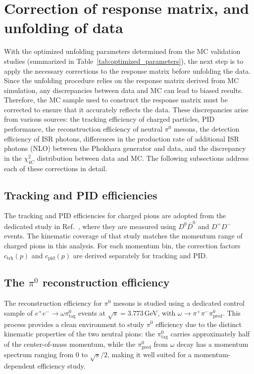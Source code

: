 \clearpage
\section{Correction of response matrix, and unfolding of data}
\label{sec:eff_corr}

With the optimized unfolding parameters determined from the MC validation studies (summarized in Table~\ref{tab:optimized_parameters}), the next step is to apply the necessary corrections to the response matrix before unfolding the data. Since the unfolding procedure relies on the response matrix derived from MC simulation, any discrepancies between data and MC can lead to biased results. Therefore, the MC sample used to construct the response matrix must be corrected to ensure that it accurately reflects the data. These discrepancies arise from various sources: the tracking efficiency of charged particles, PID performance, the reconstruction efficiency of neutral $\pi^0$ mesons, the detection efficiency of ISR photons, differences in the production rate of additional ISR photons (NLO) between the Phokhara generator and data, and the discrepancy in the $\chi^2_{4C}$ distribution between data and MC. The following subsections address each of these corrections in detail.

\subsection{Tracking and PID efficiencies}

The tracking and PID efficiencies for charged pions are adopted from the dedicated study in Ref.~\cite{BESIII_tracking_pid_2024}, where they are measured using $D^0\bar{D}^0$ and $D^+D^-$ events. The kinematic coverage of that study matches the momentum range of charged pions in this analysis. For each momentum bin, the correction factors $c_{\text{trk}}(p)$ and $c_{\text{pid}}(p)$ are derived separately for tracking and PID.

\subsection{The $\pi^0$ reconstruction efficiency}

The reconstruction efficiency for $\pi^0$ mesons is studied using a dedicated control sample of $e^+e^- \to \omega \pi^0_{\text{tag}}$ events at $\sqrt{s} = 3.773$\,GeV, with $\omega \to \pi^+\pi^-\pi^0_{\text{pred}}$. This process provides a clean environment to study $\pi^0$ efficiency due to the distinct kinematic properties of the two neutral pions: the $\pi^0_{\text{tag}}$ carries approximately half of the center-of-mass momentum, while the $\pi^0_{\text{pred}}$ from $\omega$ decay has a momentum spectrum ranging from 0 to $\sqrt{s}/2$, making it well suited for a momentum-dependent efficiency study.

